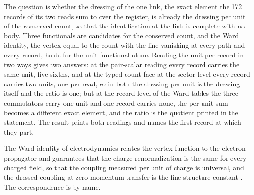 The question is whether the dressing of the one link, the exact element the 172 records of its two reads sum to over the register, is already the dressing per unit of the conserved count, so that the identification at the link is complete with no body. Three functionals are candidates for the conserved count, and the Ward identity, the vertex equal to the count with the line vanishing at every path and every record, holds for the unit functional alone. Reading the unit per record in two ways gives two answers: at the pair-scalar reading every record carries the same unit, five sixths, and at the typed-count face at the sector level every record carries two units, one per read, so in both the dressing per unit is the dressing itself and the ratio is one; but at the record level of the Ward tables the three commutators carry one unit and one record carries none, the per-unit sum becomes a different exact element, and the ratio is the quotient printed in the statement. The result prints both readings and names the first record at which they part.
\begin{chbridge}
The Ward identity of electrodynamics relates the vertex function to the electron propagator and guarantees that the charge renormalization is the same for every charged field, so that the coupling measured per unit of charge is universal, and the dressed coupling at zero momentum transfer is the fine-structure constant \cite{Ward1950,Peskin1995}. The correspondence is by name.
\end{chbridge}
